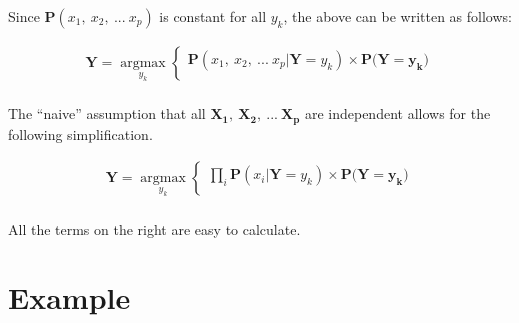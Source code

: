 \documentclass[11pt, a4paper]{article}
\begin{document}
Since $\mathbf{P}(x_1,\ x_2,\ ...\ x_p)$ is constant for all $y_k$, the above can be written as follows:

\begin{align*}
	\mathbf{Y} = \operatorname*{argmax}_{y_k}\left\{
	\begin{array}{ll}
	\mathbf{P}(x_1,\ x_2,\ ...\ x_p | \mathbf{Y}=y_k) \times \mathbf{P}(\mathbf{Y=y_k)} \\
	\end{array}
	\right.                                                                             \\
\end{align*}

The ``naive'' assumption that all $\mathbf{X_1},\ \mathbf{X_2},\ ...\ \mathbf{X_p}$ are independent allows for the following simplification.

\begin{align*}
	\mathbf{Y} = \operatorname*{argmax}_{y_k}\left\{
	\begin{array}{ll}
	\prod_{i} \mathbf{P}(x_i|\mathbf{Y}=y_k) \times \mathbf{P}(\mathbf{Y=y_k)} \\
	\end{array}
	\right.                                                                    \\
\end{align*}

All the terms on the right are easy to calculate.

\section{Example}
\end{document}
